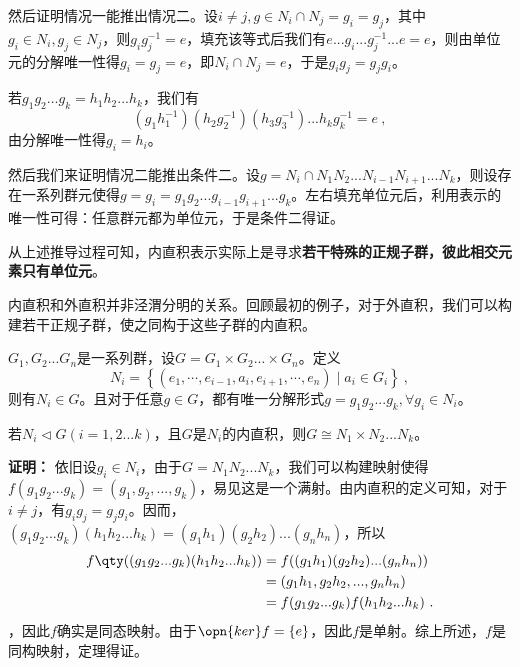 然后证明情况一能推出情况二。设$i\neq j,g\in N_i\cap N_j=g_i=g_j$，其中$g_i\in N_i,g_j\in N_j$，则$g_ig_j^{-1}=e$，填充该等式后我们有$e...g_i...g_j^{-1}...e=e$，则由单位元的分解唯一性得$g_i=g_j=e$，即$N_i\cap N_j=e$，于是$g_ig_j=g_jg_i$。


若$g_1g_2...g_k=h_1h_2...h_k$，我们有
\begin{equation}
(g_1h_1^{-1})(h_2g_2^{-1})(h_3g_3^{-1})...h_kg_k^{-1}=e~,
\end{equation}
由分解唯一性得$g_i=h_i$。

然后我们来证明情况二能推出条件二。设$g=N_i\cap N_1N_2...N_{i-1}N_{i+1}...N_k$，则设存在一系列群元使得$g=g_i=g_1g_2...g_{i-1}g_{i+1}...g_k$。左右填充单位元后，利用表示的唯一性可得：任意群元都为单位元，于是条件二得证。


从上述推导过程可知，内直积表示实际上是寻求\textbf{若干特殊的正规子群，彼此相交元素只有单位元}。

内直积和外直积并非泾渭分明的关系。回顾最初的例子，对于外直积，我们可以构建若干正规子群，使之同构于这些子群的内直积。

\begin{theorem}{}
$G_1,G_2...G_n$是一系列群，设$G=G_1\times G_2...\times G_n$。定义
\begin{equation}
N_i=\left\{\left(e_1, \cdots, e_{i-1}, a_i, e_{i+1}, \cdots, e_n\right) \mid a_i \in G_i\right\}~,
\end{equation}
则有$N_i\in G$。且对于任意$g\in G$，都有唯一分解形式$g=g_1g_2...g_k,\forall g_i\in N_i$。
\end{theorem}

\begin{theorem}{}
若$N_i\triangleleft G(i=1,2...k)$，且$G$是$N_i$的内直积，则$G\cong N_1\times N_2...N_k$。
\end{theorem}
\textbf{证明：}
依旧设$g_i\in N_i$，由于$G=N_1N_2...N_k$，我们可以构建映射使得$f(g_1g_2...g_k)=(g_1,g_2,...,g_k)$，易见这是一个满射。由内直积的定义可知，对于$i\neq j$，有$g_ig_j=g_jg_i$。因而，$(g_1g_2...g_k)(h_1h_2...h_k)=(g_1h_1)(g_2h_2)...(g_nh_n)$，所以
\begin{equation}
\begin{aligned}
f\qty((g_1g_2...g_k)(h_1h_2...h_k))&=f((g_1h_1)(g_2h_2)...(g_nh_n))\\
&=(g_1h_1,g_2h_2,...,g_nh_n)\\
&=f(g_1g_2...g_k)f(h_1h_2...h_k)~.
\end{aligned}
\end{equation}
，因此$f$确实是同态映射。由于$\opn{ker}f=\{e\}$，因此$f$是单射。综上所述，$f$是同构映射，定理得证。


